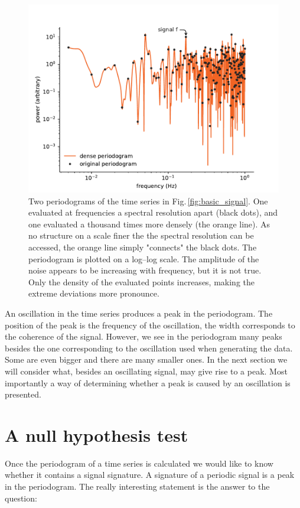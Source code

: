 \begin{figure}
  \centering \includegraphics[width=0.8\linewidth]{gfx/axions/basic_periodogram_loglog.pdf}
  \caption{Two periodograms of the time series in Fig.\,\ref{fig:basic_signal}. One evaluated at frequencies a spectral resolution apart (black dots), and one evaluated a thousand times more densely (the orange line). As no structure on a scale finer the the spectral resolution can be accessed, the orange line simply "connects" the black dots. The periodogram is plotted on a log--log scale. The amplitude of the noise appears to be increasing with frequency, but it is not true. Only the density of the evaluated points increases, making the extreme deviations more pronounce.}
  \label{fig:basic_periodogram_loglog}
\end{figure}

An oscillation in the time series produces a peak in the periodogram. The position of the peak is the frequency of the oscillation, the width corresponds to the coherence of the signal. However, we see in the periodogram many peaks besides the one corresponding to the oscillation used when generating the data. Some are even bigger and there are many smaller ones. In the next section we will consider what, besides an oscillating signal, may give rise to a peak. Most importantly a way of determining whether a peak is caused by an oscillation is presented.




\section{A null hypothesis test}
Once the periodogram of a time series is calculated we would like to know whether it contains a signal signature. A signature of a periodic signal is a peak in the periodogram. The really interesting statement is the answer to the question:

